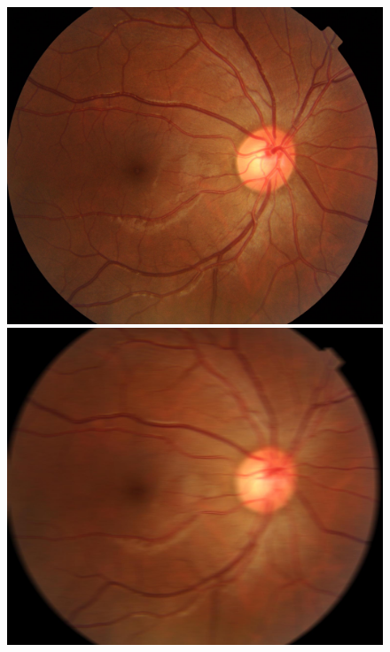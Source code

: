 \documentclass[../main.tex]{subfiles}
\begin{document}
\begin{figure}[htbp]
\centering
\begin{minipage}{5cm}
\centering
\includegraphics[width=1\linewidth]{testimage.jpg}
\subcaption{}
\end{minipage}
\begin{minipage}{5cm}
\centering
\includegraphics[width=1\linewidth]{testimage_augmented__1.jpg}
\subcaption{}
\end{minipage}

\end{figure}
\end{document}
